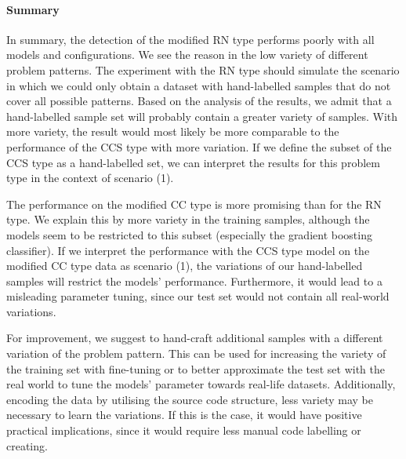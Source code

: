 \paragraph{Summary}
In summary, the detection of the modified RN type performs poorly with all models and configurations. We see the reason in the low variety of different problem patterns. The experiment with the RN type should simulate the scenario in which we could only obtain a dataset with hand-labelled samples that do not cover all possible patterns. Based on the analysis of the results, we admit that a hand-labelled sample set will probably contain a greater variety of samples. With more variety, the result would most likely be more comparable to the performance of the CCS type with more variation. If we define the subset of the CCS type as a hand-labelled set, we can interpret the results for this problem type in the context of scenario (1). 

The performance on the modified CC type is more promising than for the RN type. We explain this by more variety in the training samples, although the models seem to be restricted to this subset (especially the gradient boosting classifier). If we interpret the performance with the CCS type model on the modified CC type data as scenario (1), the variations of our hand-labelled samples will restrict the models' performance. Furthermore, it would lead to a misleading parameter tuning, since our test set would not contain all real-world variations.

For improvement, we suggest to hand-craft additional samples with a different variation of the problem pattern. This can be used for increasing the variety of the training set with fine-tuning or to better approximate the test set with the real world to tune the models' parameter towards real-life datasets. Additionally, encoding the data by utilising the source code structure, less variety may be necessary to learn the variations. If this is the case, it would have positive practical implications, since it would require less manual code labelling or creating.



